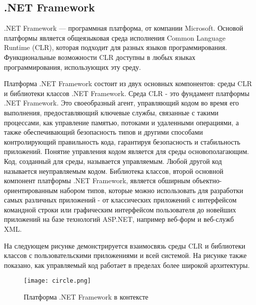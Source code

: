 \subsection{.NET Framework}


.NET Framework — программная платформа, от компании Microsoft. Основой платформы является общеязыковая среда исполнения Common Language Runtime (CLR), которая подходит для разных языков программирования. Функциональные возможности CLR доступны в любых языках программирования, использующих эту среду.

Платформа  .NET Framework состоит из двух основных компонентов: среды CLR и библиотеки классов .NET Framework. Среда CLR - это фундамент платформы .NET Framework. Это своеобразный агент, управляющий кодом во время его выполнения, предоставляющий ключевые службы, связанные с такими процессами, как управление памятью, потоками и удаленными операциями, а также обеспечивающий безопасность типов и другими способами контролирующий правильность кода, гарантируя безопасность и стабильность приложений. Понятие управления кодом является для среды основополагающим. Код, созданный для среды, называется управляемым. Любой другой код называется неуправляемым кодом. Библиотека классов, второй основной компонент платформы .NET Framework, является обширным объектно-ориентированным набором типов, которые можно использовать для разработки самых различных приложений - от классических приложений с интерфейсом командной строки или графическим интерфейсом пользователя до новейших приложений на базе технологий ASP.NET, например веб-форм и веб-служб XML.

На следующем рисунке демонстрируется взаимосвязь среды CLR и библиотеки классов с пользовательскими приложениями и всей системой. На рисунке также показано, как управляемый код работает в пределах более широкой архитектуры.

\begin{figure}[h!]
	\centering
	\texttt{[image: circle.png]}
	\caption{Платформа .NET Framework в контексте}
\end{figure}
